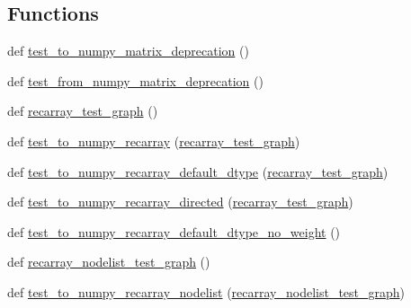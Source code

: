 \subsection*{Functions}
\begin{DoxyCompactItemize}
\item 
def \hyperlink{namespacenetworkx_1_1tests_1_1test__convert__numpy_a11ad86921a02d89f4492b97b0cfc330d}{test\+\_\+to\+\_\+numpy\+\_\+matrix\+\_\+deprecation} ()
\item 
def \hyperlink{namespacenetworkx_1_1tests_1_1test__convert__numpy_abbb70a12f0875dec4543e6a5306e2113}{test\+\_\+from\+\_\+numpy\+\_\+matrix\+\_\+deprecation} ()
\item 
def \hyperlink{namespacenetworkx_1_1tests_1_1test__convert__numpy_ab287efd38ab5d87ac82f0528b8ccfdf3}{recarray\+\_\+test\+\_\+graph} ()
\item 
def \hyperlink{namespacenetworkx_1_1tests_1_1test__convert__numpy_a717b093f777a008e2a94d02def89e100}{test\+\_\+to\+\_\+numpy\+\_\+recarray} (\hyperlink{namespacenetworkx_1_1tests_1_1test__convert__numpy_ab287efd38ab5d87ac82f0528b8ccfdf3}{recarray\+\_\+test\+\_\+graph})
\item 
def \hyperlink{namespacenetworkx_1_1tests_1_1test__convert__numpy_aede1de97dcce6b1c67daa88c61719ddb}{test\+\_\+to\+\_\+numpy\+\_\+recarray\+\_\+default\+\_\+dtype} (\hyperlink{namespacenetworkx_1_1tests_1_1test__convert__numpy_ab287efd38ab5d87ac82f0528b8ccfdf3}{recarray\+\_\+test\+\_\+graph})
\item 
def \hyperlink{namespacenetworkx_1_1tests_1_1test__convert__numpy_af5aae9e1cabde48519859d19f2bb0276}{test\+\_\+to\+\_\+numpy\+\_\+recarray\+\_\+directed} (\hyperlink{namespacenetworkx_1_1tests_1_1test__convert__numpy_ab287efd38ab5d87ac82f0528b8ccfdf3}{recarray\+\_\+test\+\_\+graph})
\item 
def \hyperlink{namespacenetworkx_1_1tests_1_1test__convert__numpy_aab56ac46253775de26d31b994f3bd01d}{test\+\_\+to\+\_\+numpy\+\_\+recarray\+\_\+default\+\_\+dtype\+\_\+no\+\_\+weight} ()
\item 
def \hyperlink{namespacenetworkx_1_1tests_1_1test__convert__numpy_ad40ef5d5fb6b2aba483745b500f62251}{recarray\+\_\+nodelist\+\_\+test\+\_\+graph} ()
\item 
def \hyperlink{namespacenetworkx_1_1tests_1_1test__convert__numpy_a466bc6186f08cfa430476f40cb1704db}{test\+\_\+to\+\_\+numpy\+\_\+recarray\+\_\+nodelist} (\hyperlink{namespacenetworkx_1_1tests_1_1test__convert__numpy_ad40ef5d5fb6b2aba483745b500f62251}{recarray\+\_\+nodelist\+\_\+test\+\_\+graph})

\end{DoxyCompactItemize}
